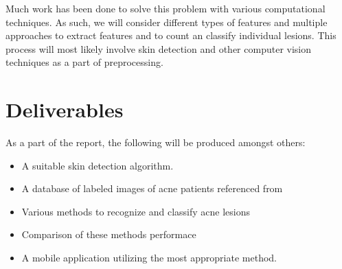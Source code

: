 Much work has been done to solve this problem with various computational techniques\cite{acne1, acne2, acne3, acne4}. As such, we will consider different types of features and multiple approaches to extract features and to count an classify individual lesions. This process will most likely involve skin detection\cite{skin1, skin2} and other computer vision techniques as a part of preprocessing. \\ \medskip



\section*{Deliverables}
As a part of the report, the following will be produced amongst others:
\begin{itemize}
\item A suitable skin detection algorithm.
\item A database of labeled images of acne patients referenced from \cite{data}
\item Various methods to recognize and classify acne lesions
\item Comparison of these methods performace
\item A mobile application utilizing the most appropriate method. \cite{*}
\end{itemize}





